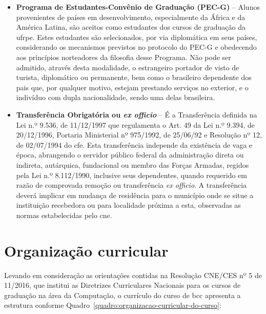 \documentclass[
	12pt,				%
	openright,			%
  oneside,     %
	a4paper,			%
 hyphens,
	chapter=TITLE,		%
	english,			%
	french,				%
	spanish,			%
	brazil				%
	]{abntex2}
\begin{document}
\begin{itemize}
    \item \textbf{Programa de Estudantes-Convênio de Graduação (PEC-G)} – Alunos provenientes de países em desenvolvimento, especialmente da África e da América Latina, são aceitos como estudantes dos cursos de graduação da \acrshort{ufrpe}. Estes estudantes são selecionados, por via diplomática em seus países, considerando os mecanismos previstos no protocolo do PEC-G e obedecendo aos princípios norteadores da filosofia desse Programa. Não pode ser admitido, através desta modalidade, o estrangeiro portador de visto de turista, diplomático ou permanente, bem como o brasileiro dependente dos pais que, por qualquer motivo, estejam prestando serviços no exterior, e o indivíduo com dupla nacionalidade, sendo uma delas brasileira.
    \item {\bfseries Transferência Obrigatória ou \textit{ex officio}} – É a Transferência definida na Lei n.º 9.536, de 11/12/1997 que regulamenta o Art. 49 da Lei n.º 9.394, de 20/12/1996, Portaria Ministerial nº 975/1992, de 25/06/92 e Resolução nº 12, de 02/07/1994 do \acrfull{cfe}. Esta transferência independe da existência de vaga e época, abrangendo o servidor público federal da administração direta ou indireta, autárquica, fundacional ou membro das Forças Armadas, regidos pela Lei n.º 8.112/1990, inclusive seus dependentes, quando requerido em razão de comprovada remoção ou transferência \textit{ex officio}. A transferência deverá implicar em mudança de residência para o município onde se situe a instituição recebedora ou para localidade próxima a esta, observadas as normas estabelecidas pelo \acrshort{cne}.
\end{itemize}





%
%


\chapter{Organização curricular}

Levando em consideração as orientações contidas na Resolução CNE/CES nº 5 de 11/2016, que institui as Diretrizes Curriculares Nacionais para os cursos de graduação na área da Computação, o currículo do curso de \acrshort{bcc} apresenta a estrutura conforme Quadro~\ref{quadro:organizacao-curricular-do-curso}:
\end{document}
